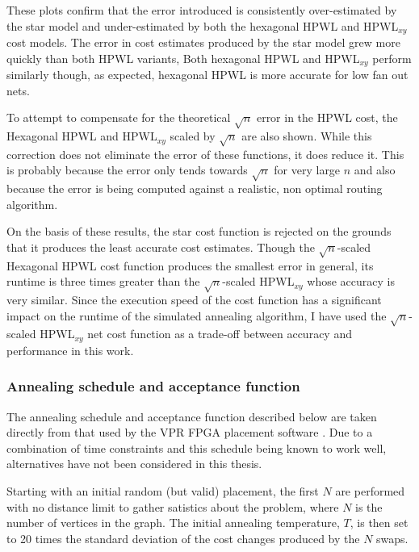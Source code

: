 				These plots confirm that the error introduced is consistently
				over-estimated by the star model and under-estimated by both the
				hexagonal HPWL and HPWL${_{xy}}$ cost models. The error in cost
				estimates produced by the star model grew more quickly than both HPWL
				variants, Both hexagonal HPWL and HPWL$_{xy}$ perform similarly though,
				as expected, hexagonal HPWL is more accurate for low fan out nets.
				
				To attempt to compensate for the theoretical $\sqrt{n}$ error in the
				HPWL cost, the Hexagonal HPWL and HPWL$_{xy}$ scaled by $\sqrt{n}$ are
				also shown. While this correction does not eliminate the error of these
				functions, it does reduce it. This is probably because the error only
				tends towards $\sqrt{n}$ for very large $n$ \cite{chung79} and also
				because the error is being computed against a realistic, non optimal
				routing algorithm.
				
				On the basis of these results, the star cost function is rejected on
				the grounds that it produces the least accurate cost estimates. Though
				the $\sqrt{n}$-scaled Hexagonal HPWL cost function produces the
				smallest error in general, its runtime is three times greater than the
				$\sqrt{n}$-scaled HPWL$_{xy}$ whose accuracy is very similar. Since the
				execution speed of the cost function has a significant impact on the
				runtime of the simulated annealing algorithm, I have used the
				$\sqrt{n}$-scaled HPWL$_{xy}$ net cost function as a trade-off between
				accuracy and performance in this work.
				
			\subsubsection{Annealing schedule and acceptance function}
				
				\label{sec:placement-schedule-acceptance}
				
				The annealing schedule and acceptance function described below are
				taken directly from that used by the VPR FPGA placement software
				\cite{betz97}. Due to a combination of time constraints and this
				schedule being known to work well, alternatives have not been
				considered in this thesis.
				
				Starting with an initial random (but valid) placement, the first $N$
				are performed with no distance limit to gather satistics about the
				problem, where $N$ is the number of vertices in the graph. The initial
				annealing temperature, $T$, is then set to 20 times the standard
				deviation of the cost changes produced by the $N$ swaps.
				
